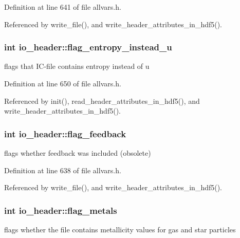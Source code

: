 Definition at line 641 of file allvars.h.



Referenced by write\_\-file(), and write\_\-header\_\-attributes\_\-in\_\-hdf5().

\hypertarget{structio__header_a448788ace72155e22d19af1c01917857}{
\subsubsection[{flag\_\-entropy\_\-instead\_\-u}]{\setlength{\rightskip}{0pt plus 5cm}int {\bf io\_\-header::flag\_\-entropy\_\-instead\_\-u}}}
\label{structio__header_a448788ace72155e22d19af1c01917857}
flags that IC-\/file contains entropy instead of u 

Definition at line 650 of file allvars.h.



Referenced by init(), read\_\-header\_\-attributes\_\-in\_\-hdf5(), and write\_\-header\_\-attributes\_\-in\_\-hdf5().

\hypertarget{structio__header_a98679063cc311c5f6184459600fa05a5}{
\subsubsection[{flag\_\-feedback}]{\setlength{\rightskip}{0pt plus 5cm}int {\bf io\_\-header::flag\_\-feedback}}}
\label{structio__header_a98679063cc311c5f6184459600fa05a5}
flags whether feedback was included (obsolete) 

Definition at line 638 of file allvars.h.



Referenced by write\_\-file(), and write\_\-header\_\-attributes\_\-in\_\-hdf5().

\hypertarget{structio__header_ac025f6c1cff1914d893ce0c7c5fd46bb}{
\subsubsection[{flag\_\-metals}]{\setlength{\rightskip}{0pt plus 5cm}int {\bf io\_\-header::flag\_\-metals}}}
\label{structio__header_ac025f6c1cff1914d893ce0c7c5fd46bb}
flags whether the file contains metallicity values for gas and star particles 

